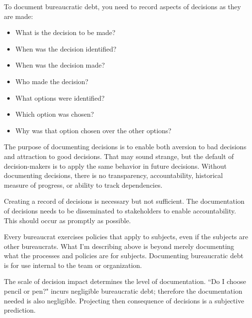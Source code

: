 To document bureaucratic debt, you need to record aspects of decisions as they are made:
\begin{itemize}
    \item What is the decision to be made?
    \item When was the decision  identified?
    \item When was the decision made?
    \item Who made the decision?
    \item What options were identified?
    \item Which option was chosen?
    \item Why was that option  chosen over the other options?
\end{itemize}
The purpose of documenting decisions is to enable both aversion to bad decisions and attraction to good decisions. That may sound strange, but the default of decision-makers is to apply the same behavior in future decisions. 
Without documenting decisions, there is no transparency, accountability, historical measure of progress, or ability to track dependencies. 

Creating a record of decisions is necessary but not sufficient. The documentation of decisions needs to be disseminated to stakeholders to enable accountability. This should occur as promptly as possible. 

Every bureaucrat exercises policies that apply to subjects, even if the subjects are other bureaucrats. What I'm describing above is beyond merely documenting what the processes and policies are for subjects. Documenting bureaucratic debt is for use internal to the team or organization.  

The scale of decision impact determines the level of documentation. ``Do I choose pencil or pen?" incurs negligible bureaucratic debt; therefore the documentation needed is also negligible. Projecting then consequence of decisions is a subjective prediction. 


